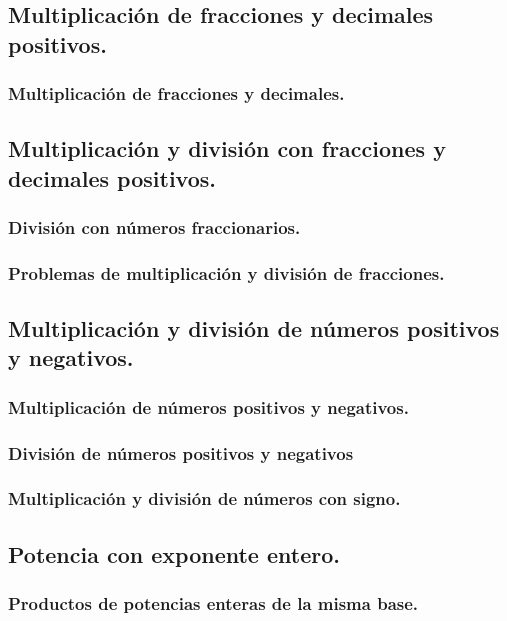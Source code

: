 \documentclass[11pt]{book}
\begin{document}
\pagestyle{empty}

\restoregeometry
\tableofcontents
\chapter{}

\section{Multiplicación de fracciones y decimales positivos.}
\subsection{Multiplicación de fracciones y decimales.}

\section{Multiplicación y división con fracciones y decimales positivos.}
\subsection{División con números fraccionarios.}
\subsection{Problemas de multiplicación y división de fracciones.}

\section{Multiplicación y división de números positivos y negativos.}
\subsection{Multiplicación de números positivos y negativos.}
\subsection{División de números positivos y negativos}
\subsection{Multiplicación y división de números con signo.}

\section{Potencia con exponente entero.}
\subsection{Productos de potencias enteras de la misma base.}
\end{document}
